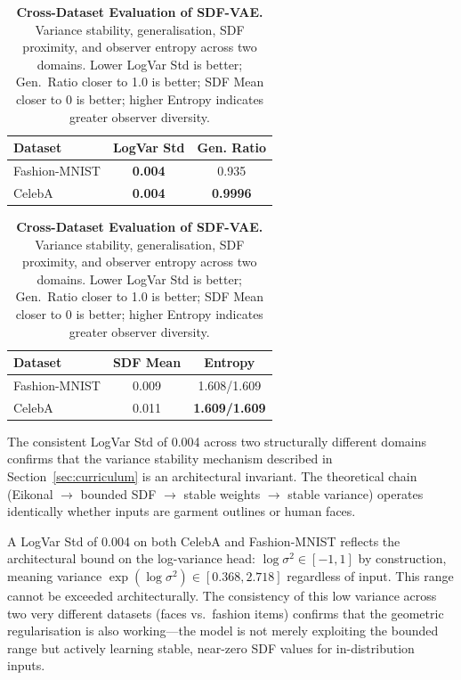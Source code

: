 \documentclass[10pt,twocolumn,letterpaper]{article}
\newcommand{\toprule}{\hline\hline}
\newcommand{\midrule}{\hline}
\newcommand{\bottomrule}{\hline\hline}
\begin{document}
\begin{table}[htbp]
\centering
\caption{\textbf{Cross-Dataset Evaluation of SDF-VAE.} Variance stability, generalisation, SDF proximity, and observer entropy across two domains. Lower LogVar Std is better; Gen.\ Ratio closer to 1.0 is better; SDF Mean closer to 0 is better; higher Entropy indicates greater observer diversity.}
\label{tab:cross_dataset}
\begin{minipage}[t]{0.48\columnwidth}
\centering
\small
\begin{tabular}{lcc}
\toprule
\textbf{Dataset} & \textbf{LogVar Std} & \textbf{Gen. Ratio} \\
\midrule
Fashion-MNIST & \textbf{0.004} & 0.935 \\
CelebA        & \textbf{0.004} & \textbf{0.9996} \\
\bottomrule
\end{tabular}
\end{minipage}\hfill
\begin{minipage}[t]{0.48\columnwidth}
\centering
\small
\begin{tabular}{lcc}
\toprule
\textbf{Dataset} & \textbf{SDF Mean} & \textbf{Entropy} \\
\midrule
Fashion-MNIST & 0.009 & 1.608/1.609 \\
CelebA        & 0.011 & \textbf{1.609/1.609} \\
\bottomrule
\end{tabular}
\end{minipage}
\end{table}

The consistent LogVar Std of 0.004 across two structurally different domains confirms that the variance stability mechanism described in Section~\ref{sec:curriculum} is an architectural invariant. The theoretical chain (Eikonal $\to$ bounded SDF $\to$ stable weights $\to$ stable variance) operates identically whether inputs are garment outlines or human faces.

\begin{intuitionbox}
A LogVar Std of 0.004 on both CelebA and Fashion-MNIST reflects the architectural bound on the log-variance head: $\log\sigma^2 \in [-1, 1]$ by construction, meaning variance $\exp(\log\sigma^2) \in [0.368, 2.718]$ regardless of input. This range cannot be exceeded architecturally. The consistency of this low variance across two very different datasets (faces vs.\ fashion items) confirms that the geometric regularisation is also working---the model is not merely exploiting the bounded range but actively learning stable, near-zero SDF values for in-distribution inputs.
\end{intuitionbox}
\end{document}
